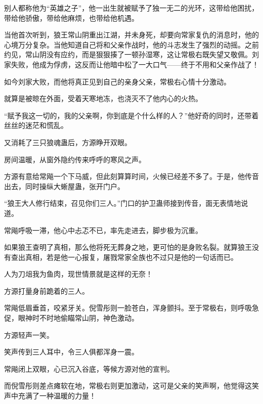 \begin{this_body}
别人都称他为“英雄之子”，他一出生就被赋予了独一无二的光环，这带给他困扰，带给他骄傲，带给他麻烦，也带给他机遇。

当他首次听到，狼王常山阴重出江湖，并未身死，却要向常家复仇的消息时，他的心境万分复杂。当他知道自己将和父亲作战时，他的斗志发生了强烈的动摇。之前约见，常山阴没有应约，而是狠狠揍了一顿孙湿寒，这让常极右既失望又敬佩。刘家失败，他成为俘虏，这反而让他暗中松了一大口气——终于不用和父亲作战了！

如今刘家大败，而他将真正见到自己的亲身父亲，常极右心情十分激动。

就算是被晾在外面，受着天寒地冻，也浇灭不了他内心的火热。

“赋予我这一切的，我的父亲啊，你到底是个什么样的人？”他好奇的同时，还带着丝丝的迷茫和慌乱。

又消耗了三只狼魂蛊后，方源睁开双眼。

房间温暖，从窗外隐约传来呼呼的寒风之声。

方源有意给常飚一个下马威，但此刻算算时间，火候已经差不多了。于是，他传音出去，同时操纵大蜥屋蛊，张开门户。

“狼王大人修行结束，召见你们三人。”门口的护卫蛊师接到传音，面无表情地说道。

常飚呼吸一滞，他心中忐忑不已，率先走进去，脚步极为沉重。

如果狼王查明了真相，那么他将死无葬身之地，更可怕的是身败名裂。就算狼王没有查出真相，若是他一心报复，屠戮常家全族也不过只是他的一句话而已。

人为刀俎我为鱼肉，现世情景就是这样的无奈！

方源打量身前跪着的三人。

常飚低眉垂首，咬紧牙关。倪雪彤则一脸苍白，浑身颤抖。至于常极右，则呼吸急促，眼神时不时地偷瞄常山阴，神色激动。

方源轻声一笑。

笑声传到三人耳中，令三人俱都浑身一震。

常飚闭上双眼，心已沉入谷底，等候方源对他的宣判。

而倪雪彤则差点瘫软在地，常极右则更加激动，这可是父亲的笑声啊，他觉得这笑声中充满了一种温暖的力量！

\end{this_body}


